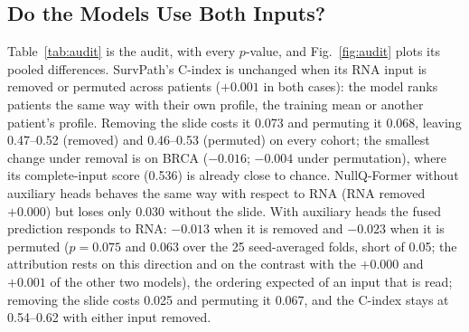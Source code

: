 \documentclass[journal]{IEEEtran}
\newcommand{\pq}{NullQ-Former}
\newcommand{\cindex}{C-index}
\begin{document}
\subsection{Do the Models Use Both Inputs?}
\label{sec:audit}
Table~\ref{tab:audit} is the audit, with every $p$-value, and Fig.~\ref{fig:audit} plots its pooled differences. SurvPath's \cindex{} is unchanged when its RNA input is removed or permuted across patients ($+0.001$ in both cases): the model ranks patients the same way with their own profile, the training mean or another patient's profile. Removing the slide costs it 0.073 and permuting it 0.068, leaving 0.47--0.52 (removed) and 0.46--0.53 (permuted) on every cohort; the smallest change under removal is on BRCA ($-0.016$; $-0.004$ under permutation), where its complete-input score (0.536) is already close to chance. \pq{} without auxiliary heads behaves the same way with respect to RNA (RNA removed $+0.000$) but loses only 0.030 without the slide. With auxiliary heads the fused prediction responds to RNA: $-0.013$ when it is removed and $-0.023$ when it is permuted ($p = 0.075$ and $0.063$ over the 25 seed-averaged folds, short of 0.05; the attribution rests on this direction and on the contrast with the $+0.000$ and $+0.001$ of the other two models), the ordering expected of an input that is read; removing the slide costs 0.025 and permuting it 0.067, and the \cindex{} stays at 0.54--0.62 with either input removed.
\end{document}
